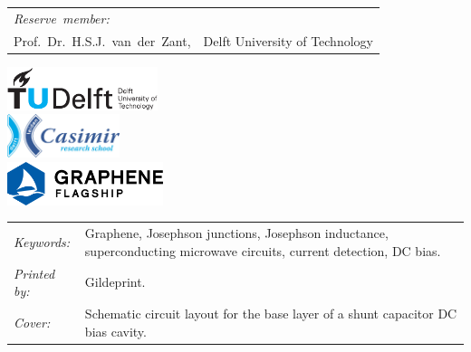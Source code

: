 \begin{titlepage}
\begin{tabular}{p{3.5cm}l}
    \medskip
    \mbox{\emph{Reserve member:}} & \\

    Prof.~Dr.~H.S.J.~van~der~Zant, & Delft University of Technology \\

\end{tabular}


\vfill
\begin{center}
    \centering
    \includegraphics[height=0.5in]{title/logos/tudelft}\\
    \vspace{1em}
    \includegraphics[height=0.5in]{title/logos/casimir}\\
    \vspace{1em}
    \includegraphics[height=0.5in]{title/logos/graphene_flagship_logo_blue}
\end{center}
\vfill

\noindent
\begin{tabular}{@{}p{}@{}p{}}
    \textit{Keywords:} & Graphene, Josephson junctions, Josephson inductance, superconducting microwave circuits, current detection, DC bias. \\
    \textit{Printed by:} &  Gildeprint. \\
    \textit{Cover:} & Schematic circuit layout for the base layer of a shunt capacitor DC bias cavity.
\end{tabular}


\end{titlepage}
